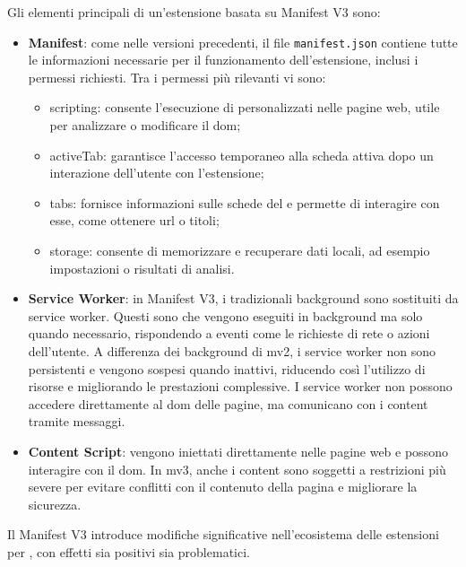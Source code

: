 \noindent Gli elementi principali di un’estensione basata su Manifest V3 sono:
\begin{itemize}
    \item \textbf{Manifest}: come nelle versioni precedenti, il file \texttt{manifest.json} contiene tutte le informazioni necessarie per il funzionamento dell’estensione, inclusi i permessi richiesti. 
    Tra i permessi più rilevanti vi sono: \begin{itemize}
        \item scripting: consente l’esecuzione di  personalizzati nelle pagine web, utile per analizzare o modificare il \acrshort{dom};
        \item activeTab: garantisce l’accesso temporaneo alla scheda attiva dopo un interazione dell’utente con l’estensione;
        \item tabs: fornisce informazioni sulle schede del  e permette di interagire con esse, come ottenere \acrshort{url} o titoli;
        \item storage: consente di memorizzare e recuperare dati locali, ad esempio impostazioni o risultati di analisi.
    \end{itemize}
    \item \textbf{Service Worker}: in Manifest V3, i tradizionali background  sono sostituiti da service worker. Questi sono  che vengono eseguiti in background ma solo quando necessario, rispondendo a eventi come le richieste di rete o azioni dell’utente. A differenza dei background  di \acrshort{mv2}, i service worker non sono persistenti e vengono sospesi quando inattivi, riducendo così l’utilizzo di risorse e migliorando le prestazioni complessive. I service worker non possono accedere direttamente al \acrshort{dom} delle pagine, ma comunicano con i content  tramite messaggi.
    \item \textbf{Content Script}: vengono iniettati direttamente nelle pagine web e possono interagire con il \acrshort{dom}. In \acrshort{mv3}, anche i content  sono soggetti a restrizioni più severe per evitare conflitti con il contenuto della pagina e migliorare la sicurezza.
\end{itemize}
\vspace{0.5cm}
\noindent Il Manifest V3 introduce modifiche significative nell’ecosistema delle estensioni per , con effetti sia positivi sia problematici.\\
